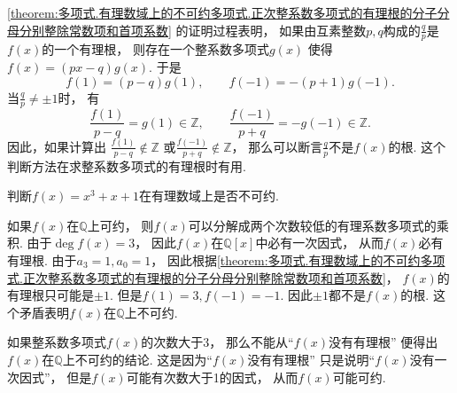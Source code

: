 \cref{theorem:多项式.有理数域上的不可约多项式.正次整系数多项式的有理根的分子分母分别整除常数项和首项系数}
的证明过程表明，
如果由互素整数\(p,q\)构成的\(\frac{q}{p}\)是\(f(x)\)的一个有理根，
则存在一个整系数多项式\(g(x)\)
使得\(f(x)=(px-q) g(x)\).
于是\begin{equation*}
	f(1)=(p-q) g(1), \qquad
	f(-1)=-(p+1) g(-1).
\end{equation*}
当\(\frac{q}{p}\neq\pm1\)时，
有\begin{equation*}
	\frac{f(1)}{p-q}=g(1)\in\mathbb{Z}, \qquad
	\frac{f(-1)}{p+q}=-g(-1)\in\mathbb{Z}.
\end{equation*}
因此，如果计算出
\(\frac{f(1)}{p-q}\notin\mathbb{Z}\)
或\(\frac{f(-1)}{p+q}\notin\mathbb{Z}\)，
那么可以断言\(\frac{q}{p}\)不是\(f(x)\)的根.
这个判断方法在求整系数多项式的有理根时有用.

\begin{example}
判断\(f(x)=x^3+x+1\)在有理数域上是否不可约.
\begin{solution}
如果\(f(x)\)在\(\mathbb{Q}\)上可约，
则\(f(x)\)可以分解成两个次数较低的有理系数多项式的乘积.
由于\(\deg f(x)=3\)，
因此\(f(x)\)在\(\mathbb{Q}[x]\)中必有一次因式，
从而\(f(x)\)必有有理根.
由于\(a_3=1,a_0=1\)，
因此根据\cref{theorem:多项式.有理数域上的不可约多项式.正次整系数多项式的有理根的分子分母分别整除常数项和首项系数}，
\(f(x)\)的有理根只可能是\(\pm1\).
但是\(f(1)=3,
f(-1)=-1\).
因此\(\pm1\)都不是\(f(x)\)的根.
这个矛盾表明\(f(x)\)在\(\mathbb{Q}\)上不可约.
\end{solution}
\end{example}

\begin{remark}
如果整系数多项式\(f(x)\)的次数大于3，
那么不能从“\(f(x)\)没有有理根”
便得出\(f(x)\)在\(\mathbb{Q}\)上不可约的结论.
这是因为“\(f(x)\)没有有理根”
只是说明“\(f(x)\)没有一次因式”，
但是\(f(x)\)可能有次数大于1的因式，
从而\(f(x)\)可能可约.
\end{remark}

